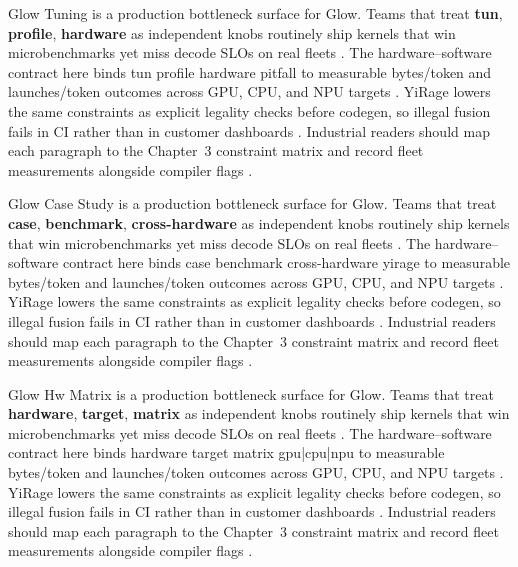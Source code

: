 Glow Tuning is a production bottleneck surface for Glow. Teams that treat \textbf{tun}, \textbf{profile}, \textbf{hardware} as independent knobs routinely ship kernels that win microbenchmarks yet miss decode SLOs on real fleets \citep{dlbook,nvidia2024cudagraphs}. The hardware--software contract here binds tun profile hardware pitfall to measurable bytes/token and launches/token outcomes across GPU, CPU, and NPU targets \citep{dao2022flashattention,liu2024deepseekv3}. YiRage lowers the same constraints as explicit legality checks before codegen, so illegal fusion fails in CI rather than in customer dashboards \citep{kwon2023vllm,patel2025llminference}. Industrial readers should map each paragraph to the Chapter~3 constraint matrix and record fleet measurements alongside compiler flags \citep{nvidia2024cudagraphs,taxbreak2026}.

Glow Case Study is a production bottleneck surface for Glow. Teams that treat \textbf{case}, \textbf{benchmark}, \textbf{cross-hardware} as independent knobs routinely ship kernels that win microbenchmarks yet miss decode SLOs on real fleets \citep{dao2022flashattention,liu2024deepseekv3}. The hardware--software contract here binds case benchmark cross-hardware yirage to measurable bytes/token and launches/token outcomes across GPU, CPU, and NPU targets \citep{kwon2023vllm,patel2025llminference}. YiRage lowers the same constraints as explicit legality checks before codegen, so illegal fusion fails in CI rather than in customer dashboards \citep{nvidia2024cudagraphs,taxbreak2026}. Industrial readers should map each paragraph to the Chapter~3 constraint matrix and record fleet measurements alongside compiler flags \citep{liu2024deepseekv3,memoryfloor2026}.

Glow Hw Matrix is a production bottleneck surface for Glow. Teams that treat \textbf{hardware}, \textbf{target}, \textbf{matrix} as independent knobs routinely ship kernels that win microbenchmarks yet miss decode SLOs on real fleets \citep{kwon2023vllm,patel2025llminference}. The hardware--software contract here binds hardware target matrix gpu|cpu|npu to measurable bytes/token and launches/token outcomes across GPU, CPU, and NPU targets \citep{nvidia2024cudagraphs,taxbreak2026}. YiRage lowers the same constraints as explicit legality checks before codegen, so illegal fusion fails in CI rather than in customer dashboards \citep{liu2024deepseekv3,memoryfloor2026}. Industrial readers should map each paragraph to the Chapter~3 constraint matrix and record fleet measurements alongside compiler flags \citep{patel2025llminference,nvidia2022hopper}.

